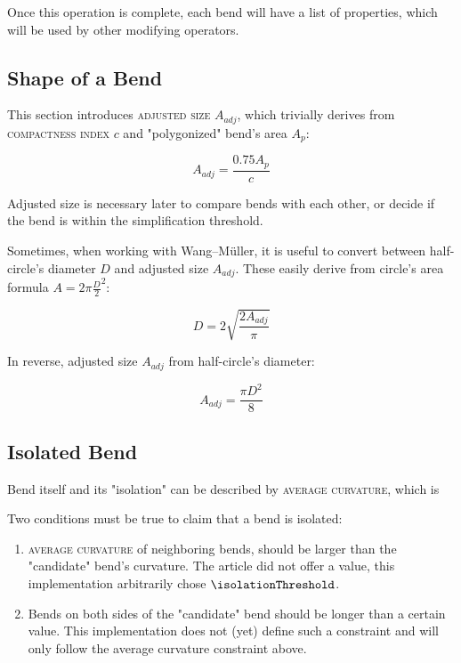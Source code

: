 \documentclass[a4paper]{article}
\newcommand{\WM}{Wang--M{\"u}ller}
\begin{document}
Once this operation is complete, each bend will have a list of properties,
which will be used by other modifying operators.

\subsection{Shape of a Bend}
\label{sec:shape-of-a-bend}

This section introduces \textsc{adjusted size} $A_{adj}$, which trivially
derives from \textsc{compactness index} $c$ and "polygonized" bend's area $A_{p}$:

\[
  A_{adj} = \frac{0.75 A_{p}}{c}
\]

Adjusted size is necessary later to compare bends with each other, or decide if
the bend is within the simplification threshold.

Sometimes, when working with {\WM}, it is useful to convert between
half-circle's diameter $D$ and adjusted size $A_{adj}$. These easily derive
from circle's area formula $A = 2\pi \frac{D}{2}^2$:

\[
  D = 2\sqrt{\frac{2 A_{adj}}{\pi}}
\]

In reverse, adjusted size $A_{adj}$ from half-circle's diameter:

\[
  A_{adj} = \frac{\pi D^2}{8}
\]

\subsection{Isolated Bend}
\label{sec:isolated-bend}

Bend itself and its "isolation" can be described by \textsc{average curvature},
which is 

Two conditions must be true to claim that a bend is isolated:

\begin{enumerate}
    \item \textsc{average curvature} of neighboring bends, should be larger
        than the "candidate" bend's curvature. The article did not offer a
        value, this implementation arbitrarily chose $\isolationThreshold$.

    \item Bends on both sides of the "candidate" bend should be longer than a
        certain value. This implementation does not (yet) define such a
        constraint and will only follow the average curvature constraint above.

\end{enumerate}
\end{document}
